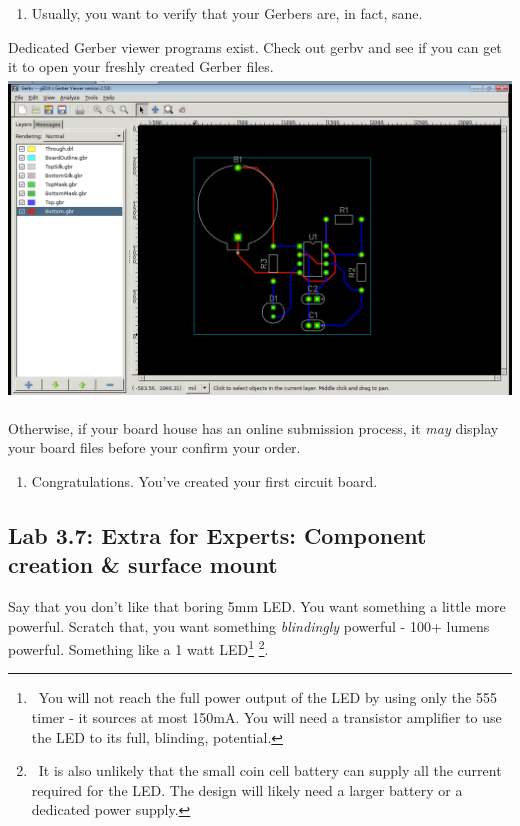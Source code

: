 \documentclass[letterpaper]{article}
\newcounter{saveenum}
\newcommand\liststyleRTFNumvi{%
\renewcommand\theenumi{\arabic{enumi}}
\renewcommand\theenumii{\alph{enumii}}
\renewcommand\theenumiii{\roman{enumiii}}
\renewcommand\theenumiv{\arabic{enumiv}}
\renewcommand\labelenumi{\theenumi.}
\renewcommand\labelenumii{\theenumii.}
\renewcommand\labelenumiii{\theenumiii.}
\renewcommand\labelenumiv{\theenumiv.}
}
\begin{document}
\liststyleRTFNumvi
\setcounter{saveenum}{\value{enumi}}
\begin{enumerate}
\setcounter{enumi}{\value{saveenum}}
\item {\sffamily\color[rgb]{0.30980393,0.5058824,0.7411765}
Usually, you want to verify that your Gerbers are, in fact, sane.}
\end{enumerate}
{\sffamily\color[rgb]{0.30980393,0.5058824,0.7411765}
Dedicated Gerber viewer programs exist. Check out gerbv and see if you can get it to open your freshly created Gerber
files.\newline
 \includegraphics[width=5.4in,height=3.3665in]{figures/ee4document-img029.png} }

{\sffamily\color[rgb]{0.30980393,0.5058824,0.7411765}
Otherwise, if your board house has an online submission process, it \textit{may} display your board files before your
confirm your order.}

\liststyleRTFNumvi
\setcounter{saveenum}{\value{enumi}}
\begin{enumerate}
\setcounter{enumi}{\value{saveenum}}
\item {\sffamily\color[rgb]{0.30980393,0.5058824,0.7411765}
Congratulations. You've created your first circuit board.}
\end{enumerate}

\bigskip

\clearpage
\bigskip

\subsection{Lab 3.7: Extra for Experts: Component creation \& surface mount}
\hypertarget{Toc337742702}{}{\sffamily\color[rgb]{0.30980393,0.5058824,0.7411765}
Say that you don't like that boring 5mm LED. You want something a little more powerful. Scratch that, you want something
\textit{blindingly} powerful - 100+ lumens powerful. Something like a 1 watt LED\footnote{\ You will not reach the full
power output of the LED by using only the 555 timer - it sources at most 150mA. You will need a transistor amplifier to
use the LED to its full, blinding, potential.} \footnote{\ It is also unlikely that the small coin cell battery can
supply all the current required for the LED. The design will likely need a larger battery or a dedicated power
supply.}.}
\end{document}
